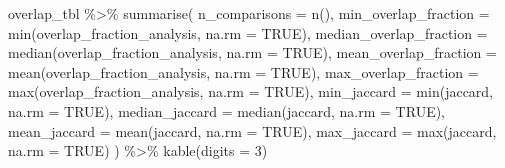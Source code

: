 \documentclass[
  letterpaper,
  DIV=11,
  numbers=noendperiod,
  openany,
  oneside]{scrreprt}
\newenvironment{Shaded}{\begin{snugshade}}{\end{snugshade}}
\newcommand{\AttributeTok}[1]{\textcolor[rgb]{0.40,0.45,0.13}{#1}}
\newcommand{\ConstantTok}[1]{\textcolor[rgb]{0.56,0.35,0.01}{#1}}
\newcommand{\DecValTok}[1]{\textcolor[rgb]{0.68,0.00,0.00}{#1}}
\newcommand{\FunctionTok}[1]{\textcolor[rgb]{0.28,0.35,0.67}{#1}}
\newcommand{\NormalTok}[1]{\textcolor[rgb]{0.00,0.23,0.31}{#1}}
\newcommand{\SpecialCharTok}[1]{\textcolor[rgb]{0.37,0.37,0.37}{#1}}
\begin{document}
\begin{Shaded}
\begin{Highlighting}[]
\NormalTok{overlap\_tbl }\SpecialCharTok{\%\textgreater{}\%}
  \FunctionTok{summarise}\NormalTok{(}
    \AttributeTok{n\_comparisons =} \FunctionTok{n}\NormalTok{(),}
    \AttributeTok{min\_overlap\_fraction =} \FunctionTok{min}\NormalTok{(overlap\_fraction\_analysis, }\AttributeTok{na.rm =} \ConstantTok{TRUE}\NormalTok{),}
    \AttributeTok{median\_overlap\_fraction =} \FunctionTok{median}\NormalTok{(overlap\_fraction\_analysis, }\AttributeTok{na.rm =} \ConstantTok{TRUE}\NormalTok{),}
    \AttributeTok{mean\_overlap\_fraction =} \FunctionTok{mean}\NormalTok{(overlap\_fraction\_analysis, }\AttributeTok{na.rm =} \ConstantTok{TRUE}\NormalTok{),}
    \AttributeTok{max\_overlap\_fraction =} \FunctionTok{max}\NormalTok{(overlap\_fraction\_analysis, }\AttributeTok{na.rm =} \ConstantTok{TRUE}\NormalTok{),}
    \AttributeTok{min\_jaccard =} \FunctionTok{min}\NormalTok{(jaccard, }\AttributeTok{na.rm =} \ConstantTok{TRUE}\NormalTok{),}
    \AttributeTok{median\_jaccard =} \FunctionTok{median}\NormalTok{(jaccard, }\AttributeTok{na.rm =} \ConstantTok{TRUE}\NormalTok{),}
    \AttributeTok{mean\_jaccard =} \FunctionTok{mean}\NormalTok{(jaccard, }\AttributeTok{na.rm =} \ConstantTok{TRUE}\NormalTok{),}
    \AttributeTok{max\_jaccard =} \FunctionTok{max}\NormalTok{(jaccard, }\AttributeTok{na.rm =} \ConstantTok{TRUE}\NormalTok{)}
\NormalTok{  ) }\SpecialCharTok{\%\textgreater{}\%}
  \FunctionTok{kable}\NormalTok{(}\AttributeTok{digits =} \DecValTok{3}\NormalTok{)}
\end{Highlighting}
\end{Shaded}
\end{document}
